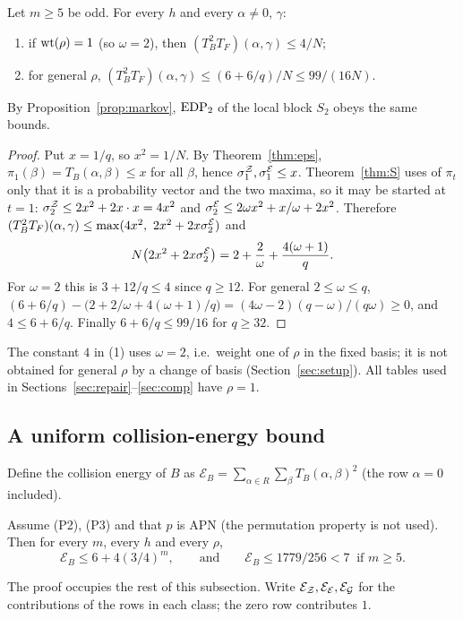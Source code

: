 \begin{theorem}\label{thm:W2}
Let $m\ge5$ be odd. For every $h$ and every $\alpha\ne0$, $\gamma$:
\begin{enumerate}
\item if $\mathrm{wt}(\rho)=1$ (so $\omega=2$), then $(T_B^2T_F)(\alpha,\gamma)\le 4/N$;
\item for general $\rho$, $(T_B^2T_F)(\alpha,\gamma)\le(6+6/q)/N\le 99/(16N)$.
\end{enumerate}
By Proposition~\ref{prop:markov}, $\mathrm{EDP}_2$ of the local block $S_2$ obeys the same bounds.
\end{theorem}
\begin{proof}
Put $x=1/q$, so $x^2=1/N$. By Theorem~\ref{thm:eps}, $\pi_1(\beta)=T_B(\alpha,\beta)\le x$ for all $\beta$, hence
$\sigma^{\mathcal{Z}}_1,\sigma^{\mathcal{E}}_1\le x$. Theorem~\ref{thm:S} uses of $\pi_t$ only that it is a probability vector and
the two maxima, so it may be started at $t=1$:
$\sigma^{\mathcal{Z}}_2\le 2x^2+2x\cdot x=4x^2$ and $\sigma^{\mathcal{E}}_2\le 2\omega x^2+x/\omega+2x^2$. Therefore
$(T_B^2T_F)(\alpha,\gamma)\le\max(4x^2,\ 2x^2+2x\sigma^{\cE}_2)$ and
\[
N\bigl(2x^2+2x\sigma^{\mathcal{E}}_2\bigr)=2+\frac2\omega+\frac{4(\omega+1)}q .
\]
For $\omega=2$ this is $3+12/q\le4$ since $q\ge12$. For general $2\le\omega\le q$,
$(6+6/q)-\bigl(2+2/\omega+4(\omega+1)/q\bigr)=(4\omega-2)(q-\omega)/(q\omega)\ge0$, and $4\le6+6/q$.
Finally $6+6/q\le 99/16$ for $q\ge32$.
\end{proof}

\begin{remark}
The constant $4$ in (1) uses $\omega=2$, i.e.\ weight one of $\rho$ in the fixed basis; it is not
obtained for general $\rho$ by a change of basis (Section~\ref{sec:setup}). All tables used in
Sections~\ref{sec:repair}--\ref{sec:comp} have $\rho=1$.
\end{remark}

\subsection{A uniform collision-energy bound}
Define the collision energy of $B$ as $\mathcal E_B=\sum_{\alpha\in R}\sum_{\beta}T_B(\alpha,\beta)^2$ (the row
$\alpha=0$ included).

\begin{theorem}\label{thm:UE}
Assume (P2), (P3) and that $p$ is APN (the permutation property is not used). Then for every $m$,
every $h$ and every $\rho$,
\[
\mathcal E_B\le 6+4(3/4)^m,\qquad\text{and}\qquad \mathcal E_B\le 1779/256<7\ \text{ if } m\ge5 .
\]
\end{theorem}
The proof occupies the rest of this subsection. Write $\mathcal E_{\mathcal{Z}},\mathcal E_{\mathcal{E}},\mathcal E_{\mathcal{G}}$ for the
contributions of the rows in each class; the zero row contributes $1$.

